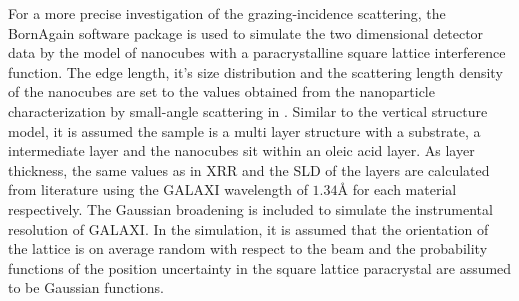 \documentclass[\main/dresen_thesis.tex]{subfiles}
\begin{document}
      For a more precise investigation of the grazing-incidence scattering, the BornAgain software package \cite{Burle_2018_borna} is used to simulate the two dimensional detector data by the model of nanocubes with a paracrystalline square lattice interference function.
      The edge length, it's size distribution and the scattering length density of the nanocubes are set to the values obtained from the nanoparticle characterization by small-angle scattering in .
      Similar to the vertical structure model, it is assumed the sample is a multi layer structure with a  substrate, a  intermediate layer and the nanocubes sit within an oleic acid layer.
      As layer thickness, the same values as in XRR and the SLD of the layers are calculated from literature using the GALAXI wavelength of $1.34 \unit{\angstrom}$ for each material respectively.
      The Gaussian broadening is included to simulate the instrumental resolution of GALAXI.
      In the simulation, it is assumed that the orientation of the lattice is on average random with respect to the beam and the probability functions of the position uncertainty in the square lattice paracrystal are assumed to be Gaussian functions.


\end{document}
